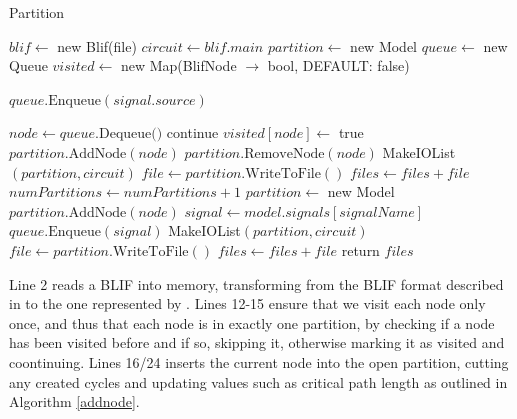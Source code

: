 \documentclass[12pt,final,oneside]{dwThesis} %
\begin{document}
   \begin{algorithm}
      \caption{Partition}\label{partition}
      \begin{algorithmic}[1]
         \State $blif \gets$ new Blif(file) 
         \State $circuit \gets blif.main$ 
         \State $partition \gets$ new Model 
         \State $queue \gets$ new Queue 
         \State $visited \gets$ new Map(BlifNode $\to$ bool, DEFAULT: false)

         \State $queue.\mbox{Enqueue}(signal.source)$
         \EndFor

         \State $node \gets queue.\mbox{Dequeue()}$
         \State continue 
         \EndIf
         \State $visited[node] \gets $ true
         \State $partition.\mbox{AddNode}(node)$
         \State $partition.\mbox{RemoveNode}(node)$
         \State MakeIOList$(partition, circuit)$
         \State $file \gets partition.\mbox{WriteToFile}()$
         \State $files \gets files+file$
         \State $numPartitions \gets numPartitions+1$
         \State $partition \gets$ new Model 
         \State $partition.\mbox{AddNode}(node)$
         \EndIf
         \State $signal \gets model.signals[signalName]$
         \State $queue.\mbox{Enqueue}(signal)$
         \EndFor
         \EndWhile
         \State MakeIOList$(partition, circuit)$
         \State $file \gets partition.\mbox{WriteToFile}()$
         \State $files \gets files+file$
         \EndIf
         \State return $files$
         \EndProcedure
      \end{algorithmic}
   \end{algorithm}
   \FloatBarrier
   Line 2 reads a \ac{BLIF} into memory, transforming from the \ac{BLIF} format described in  to the one represented by .
   Lines 12-15 ensure that we visit each node only once, and thus that each node is in exactly one partition, by checking if a node has been visited before and if so, skipping it, otherwise marking it as visited and coontinuing.
   Lines 16/24 inserts the current node into the open partition, cutting any created cycles and updating values such as critical path length as outlined in Algorithm \ref{addnode}.
\end{document}
